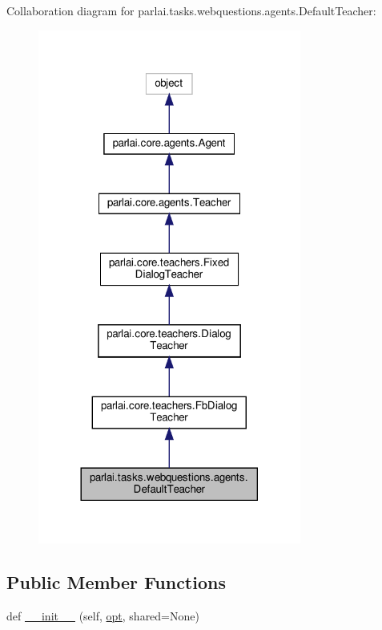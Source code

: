 Collaboration diagram for parlai.\+tasks.\+webquestions.\+agents.\+Default\+Teacher\+:
\nopagebreak
\begin{figure}[H]
\begin{center}
\leavevmode
\includegraphics[width=245pt]{d6/d11/classparlai_1_1tasks_1_1webquestions_1_1agents_1_1DefaultTeacher__coll__graph}
\end{center}
\end{figure}
\subsection*{Public Member Functions}
\begin{DoxyCompactItemize}
\item 
def \hyperlink{classparlai_1_1tasks_1_1webquestions_1_1agents_1_1DefaultTeacher_a5206081c0932010aa0cb6ac15eb51ed1}{\+\_\+\+\_\+init\+\_\+\+\_\+} (self, \hyperlink{classparlai_1_1core_1_1teachers_1_1FbDialogTeacher_af7a9ec497b9cd0292d7b8fa220da7c28}{opt}, shared=None)
\end{DoxyCompactItemize}

